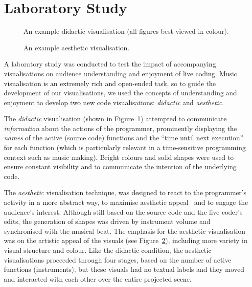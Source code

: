 \documentclass{sig-alternate}
\begin{document}
\section{Laboratory Study}

\begin{figure}
\centering
{}
\caption{An example didactic visualisation (all
  figures best viewed in colour).}
\label{fig:didactic-visualisation}
\end{figure}

\begin{figure}
\centering
{}
\caption{An example aesthetic visualisation.}
\label{fig:aesthetic-visualisation}
\end{figure}

A laboratory study was conducted to test the impact of accompanying
visualisations on audience understanding and enjoyment of live coding.
Music visualisation is an extremely rich and open-ended task, so to
guide the development of our visualisations, we used the concepts of
understanding and enjoyment to develop two new code visualisations:
\emph{didactic} and \emph{aesthetic}.

The \emph{didactic} visualisation (shown in
Figure~\ref{fig:didactic-visualisation}) attempted to communicate
\emph{information} about the actions of the programmer, prominently
displaying the \emph{names} of the active (source code) functions and
the ``time until next execution'' for each function (which is
particularly relevant in a time-sensitive programming context such as
music making). Bright colours and solid shapes were used to ensure
constant visibility and to communicate the intention of the underlying
code.

The \emph{aesthetic} visualisation technique, was designed to react to
the programmer's activity in a more abstract way, to maximise
aesthetic appeal~\cite{Cawthon2007} and to engage the audience's
interest. Although still based on the source code and the live coder's
edits, the generation of shapes was driven by instrument volume and
synchronised with the musical beat. The emphasis for the aesthetic
visualisation was on the artistic appeal of the visuals (see
Figure~\ref{fig:aesthetic-visualisation}), including more variety in
visual structure and colour. Like the didactic condition, the
aesthetic visualisations proceeded through four stages, based on the
number of active functions (instruments), but these visuals had no
textual labels and they moved and interacted with each other over the
entire projected scene.
\end{document}
